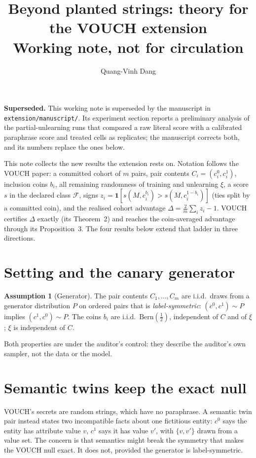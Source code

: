 \documentclass[11pt]{article}
\title{Beyond planted strings: theory for the VOUCH extension\\[2pt]
\large Working note, not for circulation}
\author{Quang-Vinh Dang}
\date{}
\theoremstyle{definition}
\newtheorem{assumption}[theorem]{Assumption}
\theoremstyle{remark}
\newcommand{\F}{\mathcal{F}}
\newcommand{\Bern}{\mathrm{Bern}}
\begin{document}
\maketitle

\noindent\textbf{Superseded.} This working note is superseded by the manuscript in
\texttt{extension/manuscript/}. Its experiment section reports a preliminary analysis of
the partial-unlearning runs that compared a raw literal score with a calibrated paraphrase
score and treated cells as replicates; the manuscript corrects both, and its numbers
replace the ones below.

\medskip\noindent This note collects the new results the extension rests on. Notation follows
the VOUCH paper: a committed cohort of $m$ pairs, pair contents $C_i=(c_i^0,c_i^1)$,
inclusion coins $b_i$, all remaining randomness of training and unlearning $\xi$, a
score $s$ in the declared class $\F$, signs
$z_i = \mathbf 1[s(M,c_i^{b_i}) > s(M,c_i^{1-b_i})]$ (ties split by a committed coin),
and the realised cohort advantage $\Delta = \tfrac2m\sum_i z_i - 1$. VOUCH certifies
$\Delta$ exactly (its Theorem~2) and reaches the coin-averaged advantage through its
Proposition~3. The four results below extend that ladder in three directions.

\section{Setting and the canary generator}

\begin{assumption}[Generator]\label{ass:gen}
The pair contents $C_1,\dots,C_m$ are i.i.d.\ draws from a generator distribution
$P$ on ordered pairs that is \emph{label-symmetric}: $(c^0,c^1)\sim P$ implies
$(c^1,c^0)\sim P$. The coins $b_i$ are i.i.d.\ $\Bern(\frac12)$, independent of $C$ and
of $\xi$; $\xi$ is independent of $C$.
\end{assumption}

Both properties are under the auditor's control: they describe the auditor's own
sampler, not the data or the model.

\section{Semantic twins keep the exact null}

VOUCH's secrets are random strings, which have no paraphrase. A semantic twin pair
instead states two incompatible facts about one fictitious entity: $c^0$ says the
entity has attribute value $v$, $c^1$ says it has value $v'$, with $\{v,v'\}$ drawn
from a value set. The concern is that semantics might break the symmetry that makes
the VOUCH null exact. It does not, provided the generator is label-symmetric.
\end{document}
